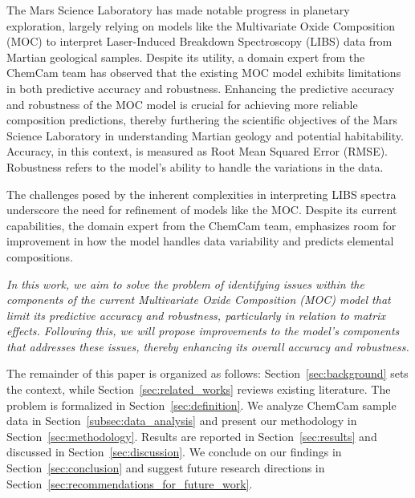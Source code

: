 The Mars Science Laboratory has made notable progress in planetary exploration, largely relying on models like the Multivariate Oxide Composition (MOC) to interpret Laser-Induced Breakdown Spectroscopy (LIBS) data from Martian geological samples.
Despite its utility, a domain expert from the ChemCam team has observed that the existing MOC model exhibits limitations in both predictive accuracy and robustness.
Enhancing the predictive accuracy and robustness of the MOC model is crucial for achieving more reliable composition predictions, thereby furthering the scientific objectives of the Mars Science Laboratory in understanding Martian geology and potential habitability.
Accuracy, in this context, is measured as Root Mean Squared Error (RMSE).
Robustness refers to the model's ability to handle the variations in the data.

The challenges posed by the inherent complexities in interpreting LIBS spectra underscore the need for refinement of models like the MOC. 
Despite its current capabilities, the domain expert from the ChemCam team, emphasizes room for improvement in how the model handles data variability and predicts elemental compositions.

\textit{In this work, we aim to solve the problem of identifying issues within the components of the current Multivariate Oxide Composition (MOC) model that limit its predictive accuracy and robustness, particularly in relation to matrix effects. Following this, we will propose improvements to the model's components that addresses these issues, thereby enhancing its overall accuracy and robustness.}

The remainder of this paper is organized as follows:
Section~\ref{sec:background} sets the context, while Section~\ref{sec:related_works} reviews existing literature.
The problem is formalized in Section~\ref{sec:definition}.
We analyze ChemCam sample data in Section~\ref{subsec:data_analysis} and present our methodology in Section~\ref{sec:methodology}.
Results are reported in Section~\ref{sec:results} and discussed in Section~\ref{sec:discussion}.
We conclude on our findings in Section~\ref{sec:conclusion} and suggest future research directions in Section~\ref{sec:recommendations_for_future_work}.
